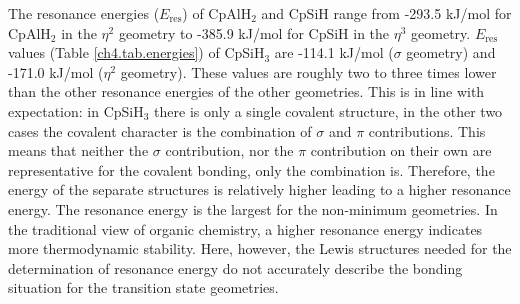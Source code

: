 The resonance energies ($E_\mathrm{res}$) of CpAlH$_2$ and CpSiH range from \mbox{-293.5} kJ/mol for CpAlH$_2$ in the $\eta^2$ geometry to \mbox{-385.9} kJ/mol for CpSiH in the $\eta^3$ geometry. $E_\mathrm{res}$ values (Table \ref{ch4.tab.energies}) of CpSiH$_3$ are \mbox{-114.1} kJ/mol ($\sigma$ geometry) and \mbox{-171.0} kJ/mol ($\eta^2$ geometry). These values are roughly two to three times lower than the other resonance energies of the other geometries. This is in line with expectation: in CpSiH$_3$ there is only a single covalent structure, in the other two cases the covalent character is the combination of $\sigma$ and $\pi$ contributions. This means that neither the $\sigma$ contribution, nor the $\pi$ contribution on their own are representative for the covalent bonding, only the combination is. Therefore, the energy of the separate structures is relatively higher leading to a higher resonance energy. The resonance energy is the largest for the non-minimum geometries. In the traditional view of organic chemistry, a higher resonance energy indicates more thermodynamic stability. Here, however, the Lewis structures needed for the determination of resonance energy do not accurately describe the bonding situation for the transition state geometries.

